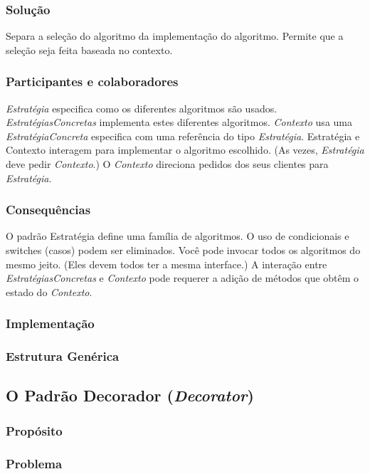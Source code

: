 \documentclass[
	11pt,				%
	openright,
	twoside,			%
	a4paper,			%
	english,			%
	french,
	brazil,				%
	sumario=tradicional
	]{abntex2}
\begin{document}
\subsubsection{Solução}
Separa a seleção do algoritmo da implementação do algoritmo. Permite que a seleção seja feita baseada no contexto.

\subsubsection{Participantes e colaboradores}
\emph{Estratégia} especifica como os diferentes algoritmos são usados. \emph{EstratégiasConcretas} implementa estes diferentes algoritmos. \emph{Contexto} usa uma \emph{EstratégiaConcreta} especifica com uma referência do tipo \emph{Estratégia}. Estratégia e Contexto interagem para implementar o algoritmo escolhido. (As vezes, \emph{Estratégia} deve pedir \emph{Contexto}.) O \emph{Contexto} direciona pedidos dos seus clientes para \emph{Estratégia}.

\subsubsection{Consequências}
O padrão Estratégia define uma família de algoritmos. O uso de condicionais e switches (casos) podem ser eliminados. Você pode invocar todos os algoritmos do mesmo jeito. (Eles devem todos ter a mesma interface.) A interação entre \emph{EstratégiasConcretas} e \emph{Contexto} pode requerer a adição de métodos que obtêm o estado do \emph{Contexto}.

\subsubsection{Implementação}
\subsubsection{Estrutura Genérica}

\subsection{O Padrão Decorador (\textit{Decorator})}
\subsubsection{Propósito}
\subsubsection{Problema}
\end{document}
